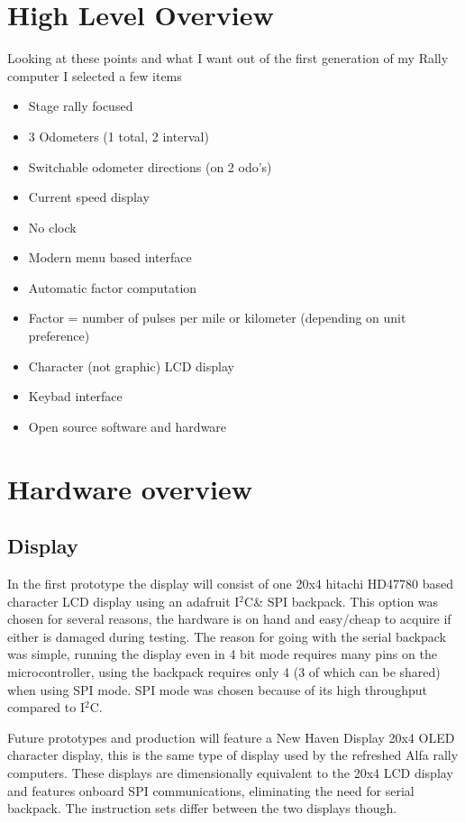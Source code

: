 \documentclass[letterpaper,11pt]{article}
\newcommand{\IIC}
{I$^2$C}
\begin{document}
\section{High Level Overview}
Looking at these points and what I want out of the first generation of my Rally computer I selected a few items
\begin{itemize}
	\item Stage rally focused
	\item 3 Odometers (1 total, 2 interval)
	\item Switchable odometer directions (on 2 odo's)
	\item Current speed display
	\item No clock
	\item Modern menu based interface
	\item Automatic factor computation
	\item Factor = number of pulses per mile or kilometer (depending on unit preference)
	\item Character (not graphic) LCD display
	\item Keybad interface
	\item Open source software and hardware
\end{itemize}

\section{Hardware overview}
\subsection{Display}
In the first prototype the display will consist of one 20x4 hitachi HD47780 based character LCD display using an adafruit \IIC \& SPI backpack. This option was chosen for several reasons, the hardware is on hand and easy/cheap to acquire if either is damaged during testing. The reason for going with the serial backpack was simple, running the display even in 4 bit mode requires many pins on the microcontroller, using the backpack requires only 4 (3 of which can be shared) when using SPI mode. SPI mode was chosen because of its high throughput compared to \IIC.

Future prototypes and production will feature a New Haven Display 20x4 OLED character display, this is the same type of display used by the refreshed Alfa rally computers. These displays are dimensionally equivalent to the 20x4 LCD display and features onboard SPI communications, eliminating the need for serial backpack. The instruction sets differ between the two displays though.
\end{document}
